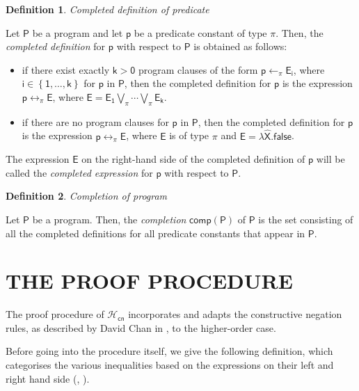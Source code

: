 \documentclass[inscr,ack,preface]{dithesis}
\theoremstyle{definition}
\newtheorem{definition}{Definition}[]
\newcommand{\hcn}{$\mathcal{H}_\mathsf{cn}$}
\newcommand{\msf}[1]{$\mathsf{#1}$}
\begin{document}
\begin{definition}{\emph{Completed definition of predicate}}\label{def:compdef}

Let \msf{P} be a program and let \msf{p} be a predicate constant of type $\pi$. Then, the \emph{completed definition} for \msf{p} with respect to \msf{P} is obtained as follows:
\begin{itemize}
  \item if there exist exactly \msf{k > 0} program clauses of the form \msf{p \leftarrow_{\pi} E_{i}}, where \msf{i \in \left\{ 1, \ldots, k \right\}} for \msf{p} in \msf{P}, then the completed definition for \msf{p} is the expression \msf{p \leftrightarrow_{\pi} E}, where \msf{E = E_1 \bigvee_{\pi} \cdots \bigvee_{\pi} E_k}.
  \item if there are no program clauses for \msf{p} in \msf{P}, then the completed definition for \msf{p} is the expression \msf{p \leftrightarrow_{\pi} E}, where \msf{E} is of type $\pi$ and \msf{E = \lambda \widehat{X}.false}.
\end{itemize}

The expression \msf{E} on the right-hand side of the completed definition of \msf{p} will be called the \emph{completed expression} for \msf{p} with respect to \msf{P}.
\end{definition}

\begin{definition}{\emph{Completion of program}}

Let \msf{P} be a program. Then, the \emph{completion} \msf{comp(P)} of \msf{P} is the set consisting of all the completed definitions for all predicate constants that appear in \msf{P}.
\end{definition}

\chapter{THE PROOF PROCEDURE}
\label{chap:proof}
The proof procedure of \hcn{} incorporates and adapts the constructive negation rules, as described by David Chan in \cite{DBLP:conf/slp/Chan89}, to the higher-order case.

Before going into the procedure itself, we give the following definition, which categorises the various inequalities based on the expressions on their left and right hand side (\cite{DBLP:conf/iclp/Chan88}, \cite{DBLP:conf/kr/CharalambidisR14}).
\end{document}
